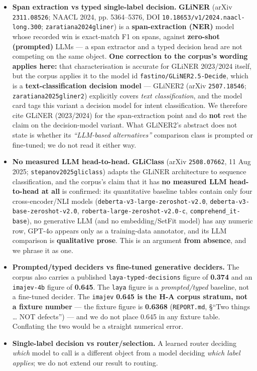 \documentclass[10pt]{article}
\begin{document}
\begin{itemize}
\item \textbf{Span extraction vs typed single-label decision.} \textbf{GLiNER} (arXiv \texttt{2311.08526}; NAACL 2024, pp. 5364--5376, DOI \texttt{10.18653/v1/2024.naacl-long.300}; \texttt{zaratiana2024gliner}\cite{zaratiana2024gliner}) is a \textbf{span-extraction (NER)} model whose recorded win is exact-match F1 on spans, against \textbf{zero-shot (prompted)} LLMs --- a span extractor and a typed decision head are not competing on the same object. \textbf{One correction to the corpus's wording applies here:} that characterisation is accurate for GLiNER 2023/2024 itself, but the corpus applies it to the model id \texttt{fastino/GLiNER2.5-Decide}, which is a \textbf{text-classification decision model} --- GLiNER2 (arXiv \texttt{2507.18546}; \texttt{zaratiana2025gliner2}\cite{zaratiana2025gliner2}) explicitly covers \emph{text classification}, and the model card tags this variant a decision model for intent classification. We therefore cite GLiNER (2023/2024) for the span-extraction point and do \textbf{not} rest the claim on the decision-model variant. What GLiNER2's abstract does not state is whether its \emph{``LLM-based alternatives''} comparison class is prompted or fine-tuned; we do not read it either way.
\item \textbf{No measured LLM head-to-head.} \textbf{GLiClass} (arXiv \texttt{2508.07662}, 11 Aug 2025; \texttt{stepanov2025gliclass}\cite{stepanov2025gliclass}) adapts the GLiNER architecture to sequence classification, and the corpus's claim that it has \textbf{no measured LLM head-to-head at all} is confirmed: its quantitative baseline tables contain only four cross-encoder/NLI models (\texttt{deberta-v3-large-zeroshot-v2.0}, \texttt{deberta-v3-base-zeroshot-v2.0}, \texttt{roberta-large-zeroshot-v2.0-c}, \texttt{comprehend\_it-base}), no generative LLM (and no embedding/SetFit model) has any numeric row, GPT-4o appears only as a training-data annotator, and its LLM comparison is \textbf{qualitative prose}. This is an argument \textbf{from absence}, and we phrase it as one.
\item \textbf{Prompted/typed deciders vs fine-tuned generative deciders.} The corpus also carries a published \texttt{laya-typed-decisions} figure of \textbf{0.374} and an \texttt{imajev-4b} figure of \textbf{0.645}. The \texttt{laya} figure is a \emph{prompted/typed} baseline, not a fine-tuned decider. The \texttt{imajev} \textbf{0.645 is the H-A corpus stratum, not a fixture number} --- the fixture figure is \textbf{0.6368} (\texttt{REPORT.md}, \S``Two things \ldots{} NOT defects'') --- and we do not place 0.645 in any fixture table. Conflating the two would be a straight numerical error.
\item \textbf{Single-label decision vs router/selection.} A learned router deciding \emph{which} model to call is a different object from a model deciding \emph{which label applies}; we do not extend our result to routing.
\end{itemize}
\end{document}
